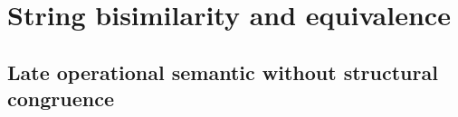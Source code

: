 % 
% 
% 
% 
% 







\section{String bisimilarity and equivalence}

\subsection{Late operational semantic without structural congruence}

